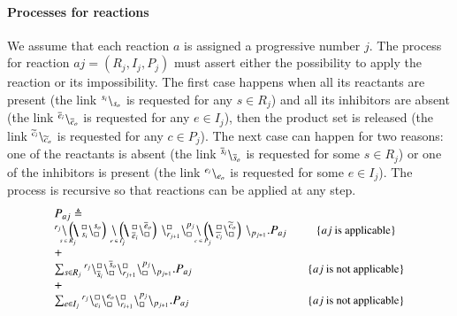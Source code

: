 \paragraph{Processes for reactions}
We assume that each reaction $a$ is assigned a progressive number $j$.
The process for reaction $aj=(R_j,I_j,P_j)$ must assert either the possibility to apply the reaction or its impossibility.
The first case happens when all its reactants are present (the link ${}^{s_i} \backslash_{s_o}$ is requested for any $s\in R_j$) and all its inhibitors are absent (the link ${}^{\overline{e}_i} \backslash_{\overline{e}_o}$ is requested for any $e\in I_j$), then the product set is released (the link ${}^{\widetilde{c}_i} \backslash_{\widetilde{c}_o}$ is requested for any $c\in P_j$).
The next case can happen for two reasons: one of the reactants is absent (the link ${}^{\overline{s}_i} \backslash_{\overline{s}_o}$ is requested for some $s\in R_j$) or one of the inhibitors is present (the link ${}^{e_i} \backslash_{e_o}$ is requested for some $e\in I_j$).
The process is recursive so that reactions can be applied at any step.
\[
\begin{array}{lcl@{\quad}l}
P_{aj} \defeq \\ 
 ^{r_j} \backslash  \blockchain{s_i}{s_o}{s \in R_j} \link{}{} \blockchain{\overline{e}_i}{\overline{e}_o}{e \in I_j} \chainedlink{r_{j+1}}{\noact}\chainedlink{\noact}{p_j}\link{}{} \blockchain{\widetilde{c}_i}{\widetilde{c}_o}{c \in P_j} \backslash_{p_{j+1}}.P_{aj} & \mbox{\small  \{$aj$ is applicable\}}\\
 + \ \\
 \sum_{s\in R_j}\startchain{r_j}\chainedlink{\overline{s}_i}{\noact}\chainedlink{\noact}{\overline{s}_o} \chainedlink{r_{j+1}}{\noact}\chainedlink{\noact}{p_{j}}\chainend{p_{j+1}}.P_{aj}  & \mbox{\small  \{$aj$ is not applicable\}}\\
+\\
 \sum_{e\in I_j}\startchain{r_j}\chainedlink{e_i}{\noact} \chainedlink{\noact}{e_o} \chainedlink{r_{i+1}}{\noact}\chainedlink{\noact}{p_{j}}\chainend{p_{j+1}}.P_{aj}  & \mbox{\small \{$aj$ is not applicable\}}\\
\end{array}
\]

